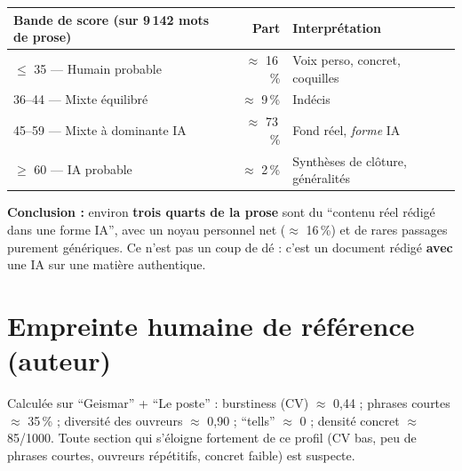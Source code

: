 \documentclass[11pt,a4paper]{article}
\newcommand{\hum}[1]{\textcolor{ok}{#1}}
\newcommand{\iaa}[1]{\textcolor{flag}{#1}}
\newcommand{\mixx}[1]{\textcolor{mix}{#1}}
\begin{document}
\begin{center}
\begin{tabularx}{\linewidth}{Y r l}
\toprule
Bande de score (sur 9\,142 mots de prose) & Part & Interprétation \\
\midrule
\hum{$\leq$ 35 --- Humain probable} & $\approx$ 16\,\% & Voix perso, concret, coquilles \\
36--44 --- Mixte équilibré & $\approx$ 9\,\% & Indécis \\
\mixx{45--59 --- Mixte à dominante IA} & $\approx$ 73\,\% & Fond réel, \emph{forme} IA \\
\iaa{$\geq$ 60 --- IA probable} & $\approx$ 2\,\% & Synthèses de clôture, généralités \\
\bottomrule
\end{tabularx}
\end{center}

\noindent \textbf{Conclusion :} environ \textbf{trois quarts de la prose} sont du
\enquote{contenu réel rédigé dans une forme IA}, avec un noyau personnel net ($\approx$
16\,\%) et de rares passages purement génériques. Ce n'est pas un coup de dé : c'est un
document rédigé \textbf{avec} une IA sur une matière authentique.

\section{Empreinte humaine de référence (auteur)}
Calculée sur \enquote{Geismar} + \enquote{Le poste} :
burstiness (CV) $\approx$ 0,44 ; phrases courtes $\approx$ 35\,\% ; diversité des ouvreurs
$\approx$ 0,90 ; \enquote{tells} $\approx$ 0 ; densité concret $\approx$ 85/1000.
Toute section qui s'éloigne fortement de ce profil (CV bas, peu de phrases courtes,
ouvreurs répétitifs, concret faible) est suspecte.
\end{document}
